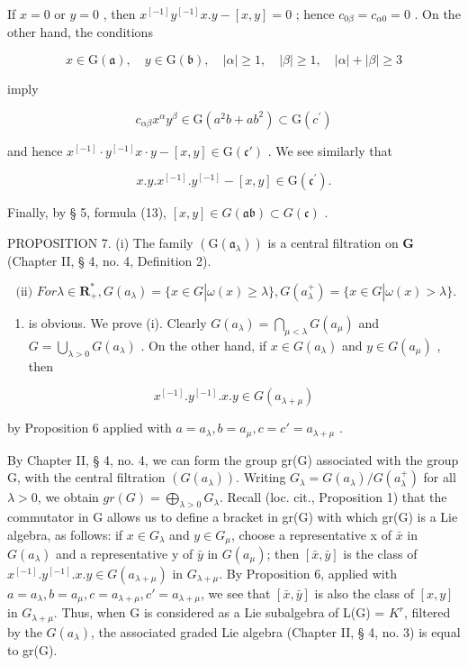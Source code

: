 If \(x = 0\) or \(y = 0\) , then \(x^{[-1]}y^{[-1]}x.y - [x,y] = 0\) ; hence \(c_{0\beta} = c_{\alpha 0} = 0\) . On the other hand, the conditions

\[
x \in \mathrm{G} (\mathfrak {a}), \quad y \in \mathrm{G} (\mathfrak {b}), \quad | \alpha | \geqslant 1, \quad | \beta | \geqslant 1, \quad | \alpha | + | \beta | \geqslant 3
\]

imply

\[
c _ {\alpha \beta} x ^ {\alpha} y ^ {\beta} \in \mathrm{G} (a ^ {2} b + a b ^ {2}) \subset \mathrm{G} (c ^ {\prime})
\]

and hence \(x^{[-1]} \cdot y^{[-1]}x \cdot y - [x, y] \in \mathrm{G}(\mathfrak{c}')\) . We see similarly that

\[
x. y. x ^ {[ - 1 ]}. y ^ {[ - 1 ]} - [ x, y ] \in \mathrm{G} (\mathfrak {c} ^ {\prime}).
\]

Finally, by § 5, formula (13), \([x,y] \in G(\mathfrak{ab}) \subset G(\mathfrak{c})\) .

PROPOSITION 7. (i) The family \((\mathrm{G}(\mathfrak{a}_{\lambda}))\) is a central filtration on \(\mathbf{G}\) (Chapter II, § 4, no. 4, Definition 2).

\[
\text { (ii) } For \lambda \in \mathbf {R} _ {+} ^ {*}, G (a _ {\lambda}) = \{x \in G | \omega (x) \geqslant \lambda \}, G (a _ {\lambda} ^ {+}) = \{x \in G | \omega (x) > \lambda \}.
\]

\begin{enumerate}
\def\labelenumi{(\roman{enumi})}
\setcounter{enumi}{1}
\tightlist
\item
  is obvious. We prove (i). Clearly \(G(a_{\lambda}) = \bigcap_{\mu < \lambda} G(a_{\mu})\) and \(G = \bigcup_{\lambda > 0} G(a_{\lambda})\) . On the other hand, if \(x \in G(a_{\lambda})\) and \(y \in G(a_{\mu})\) , then
\end{enumerate}

\[
x ^ {[ - 1 ]}. y ^ {[ - 1 ]}. x. y \in G (a _ {\lambda + \mu})
\]

by Proposition 6 applied with \(a = a_{\lambda}, b = a_{\mu}, c = c' = a_{\lambda + \mu}\) .

By Chapter II, § 4, no. 4, we can form the group gr(G) associated with the group G, with the central filtration \((G(a_\lambda))\). Writing \(G_\lambda = G(a_\lambda)/G(a_\lambda^+)\) for all \(\lambda > 0\), we obtain \(gr(G) = \bigoplus_{\lambda>0} G_\lambda\). Recall (loc. cit., Proposition 1) that the commutator in G allows us to define a bracket in gr(G) with which gr(G) is a Lie algebra, as follows: if \(x \in G_\lambda\) and \(y \in G_\mu\), choose a representative x of \(\bar{x}\) in \(G(a_\lambda)\) and a representative y of \(\bar{y}\) in \(G(a_\mu)\); then \([\bar{x},\bar{y}]\) is the class of \(x^{[-1]}.y^{[-1]}.x.y \in G(a_{\lambda+\mu})\) in \(G_{\lambda+\mu}\). By Proposition 6, applied with \(a = a_\lambda, b = a_\mu, c = a_{\lambda+\mu}, c' = a_{\lambda+\mu}\), we see that \([\bar{x},\bar{y}]\) is also the class of \([x,y]\) in \(G_{\lambda+\mu}\). Thus, when G is considered as a Lie subalgebra of L(G) = \(K^r\), filtered by the \(G(a_\lambda)\), the associated graded Lie algebra (Chapter II, § 4, no. 3) is equal to gr(G).

